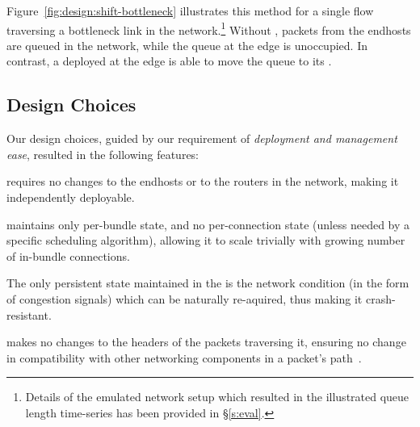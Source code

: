 Figure~\ref{fig:design:shift-bottleneck} illustrates this method for a single flow traversing a bottleneck link in the network.\footnote{Details of the emulated network setup which resulted in the illustrated queue length time-series has been provided in \S\ref{s:eval}.} Without \name, packets from the endhosts are queued in the network, while the queue at the edge is unoccupied. In contrast, a \name deployed at the edge is able to move the queue to its \inbox.









\subsection{Design Choices}

Our design choices, guided by our requirement of \emph{deployment and management ease}, resulted in the following features:

 \name requires no changes to the endhosts or to the routers in the network, making it independently deployable. 

 \name maintains only per-bundle state, and no per-connection state (unless needed by a specific scheduling algorithm), allowing it to scale trivially with growing number of in-bundle connections. 

 The only persistent state maintained in the \name is the network condition (in the form of congestion signals) which can be naturally re-aquired, thus making it crash-resistant. 

 \name makes no changes to the headers of the packets traversing it, ensuring no change in compatibility with other networking components in a packet's path~\cite{mboxbadness, ipoptions, quic}.

